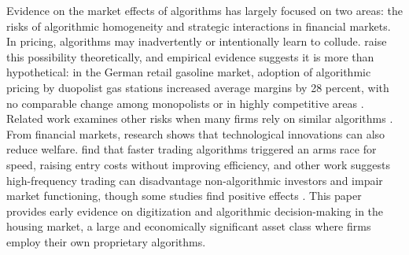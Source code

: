 \documentclass[11pt]{article}
\begin{document}
Evidence on the market effects of algorithms has largely focused on two areas: the risks of algorithmic homogeneity and strategic interactions in financial markets. In pricing, algorithms may inadvertently or intentionally learn to collude. \citet{calvanoAI} raise this possibility theoretically, and empirical evidence suggests it is more than hypothetical: in the German retail gasoline market, adoption of algorithmic pricing by duopolist gas stations increased average margins by 28 percent, with no comparable change among monopolists or in highly competitive areas \citep{assad2023}. Related work examines other risks when many firms rely on similar algorithms \citep{Kleinberg2021AlgorithmicMA, fish2024algorithmiccollusionlargelanguage, calderwang2023, mackaybrownpricing}. From financial markets, research shows that technological innovations can also reduce welfare. \citet{budishHighFrequencyTradingArms2015} find that faster trading algorithms triggered an arms race for speed, raising entry costs without improving efficiency, and other work suggests high-frequency trading can disadvantage non-algorithmic investors and impair market functioning, though some studies find positive effects \citep{jones_what_2013, menkveld_economics_2016, hendershottDoesAlgorithmicTrading2011}. This paper provides early evidence on digitization and algorithmic decision-making in the housing market, a large and economically significant asset class where firms employ their own proprietary algorithms.


\end{document}
